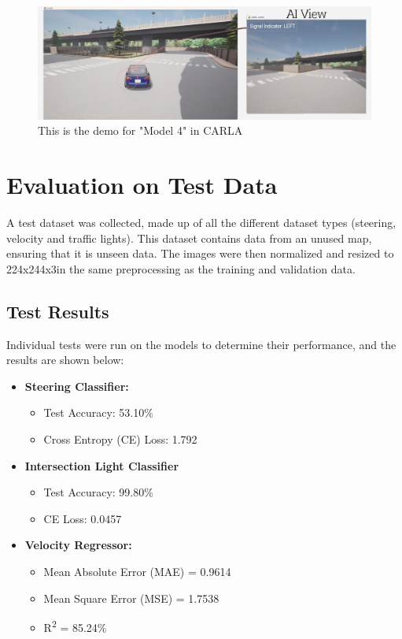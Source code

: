 \documentclass{article} %
\begin{document}
\begin{figure}[H] %
    \centering
    \includegraphics[width=1.0\textwidth]{model4demo.png} %
    \caption{This is the demo for "Model 4" in CARLA}
    \label{fig:model4demo}
\end{figure}


\section{Evaluation on Test Data}
A test dataset was collected, made up of all the different dataset types (steering, velocity and traffic lights). 
This dataset contains data from an unused map, ensuring that it is unseen data.
The images were then normalized and resized to 224x244x3in the same preprocessing as the training and validation data.

\subsection{Test Results}
Individual tests were run on the models to determine their performance, and the results are shown below:

\begin{itemize}
    \item \textbf{Steering Classifier:}
    \begin{itemize}
        \item Test Accuracy: 53.10\%
        \item Cross Entropy (CE) Loss: 1.792
    \end{itemize}

    \item \textbf{Intersection Light Classifier}
    \begin{itemize}
        \item Test Accuracy: 99.80\%
        \item CE Loss: 0.0457
    \end{itemize}

    \item \textbf{Velocity Regressor:}
    \begin{itemize}
        \item Mean Absolute Error (MAE) = 0.9614
        \item Mean Square Error (MSE) = 1.7538
        \item R\textsuperscript{2} = 85.24\%
    \end{itemize}
\end{itemize}
\end{document}

